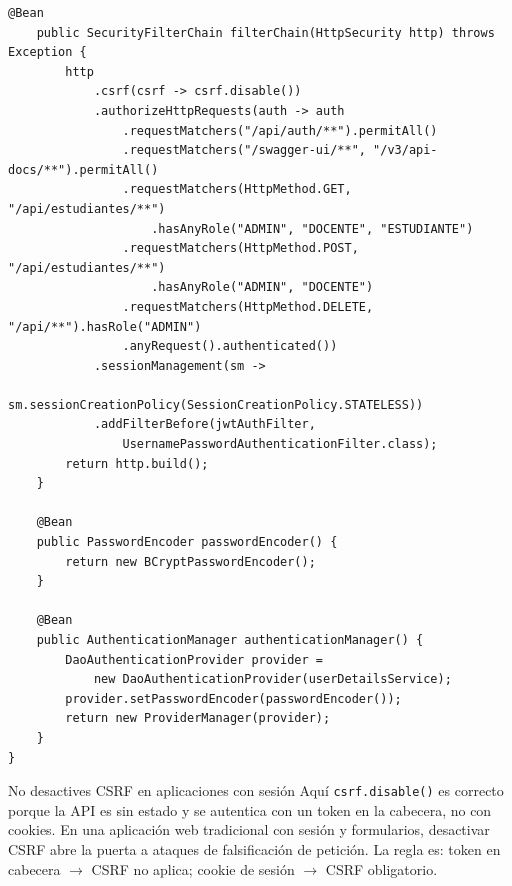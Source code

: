 \documentclass[11pt]{article}
\begin{document}
\begin{cajacodigo}
\begin{lstlisting}[style=java]
    @Bean
    public SecurityFilterChain filterChain(HttpSecurity http) throws Exception {
        http
            .csrf(csrf -> csrf.disable())
            .authorizeHttpRequests(auth -> auth
                .requestMatchers("/api/auth/**").permitAll()
                .requestMatchers("/swagger-ui/**", "/v3/api-docs/**").permitAll()
                .requestMatchers(HttpMethod.GET, "/api/estudiantes/**")
                    .hasAnyRole("ADMIN", "DOCENTE", "ESTUDIANTE")
                .requestMatchers(HttpMethod.POST, "/api/estudiantes/**")
                    .hasAnyRole("ADMIN", "DOCENTE")
                .requestMatchers(HttpMethod.DELETE, "/api/**").hasRole("ADMIN")
                .anyRequest().authenticated())
            .sessionManagement(sm ->
                sm.sessionCreationPolicy(SessionCreationPolicy.STATELESS))
            .addFilterBefore(jwtAuthFilter,
                UsernamePasswordAuthenticationFilter.class);
        return http.build();
    }

    @Bean
    public PasswordEncoder passwordEncoder() {
        return new BCryptPasswordEncoder();
    }

    @Bean
    public AuthenticationManager authenticationManager() {
        DaoAuthenticationProvider provider =
            new DaoAuthenticationProvider(userDetailsService);
        provider.setPasswordEncoder(passwordEncoder());
        return new ProviderManager(provider);
    }
}
\end{lstlisting}
\end{cajacodigo}

\begin{cajadanger}{No desactives CSRF en aplicaciones con sesión}
Aquí \texttt{csrf.disable()} es correcto porque la API es sin estado y se autentica con un token en la cabecera, no con cookies. En una aplicación web tradicional con sesión y formularios, desactivar CSRF abre la puerta a ataques de falsificación de petición. La regla es: token en cabecera $\rightarrow$ CSRF no aplica; cookie de sesión $\rightarrow$ CSRF obligatorio.\par
\end{cajadanger}
\end{document}

